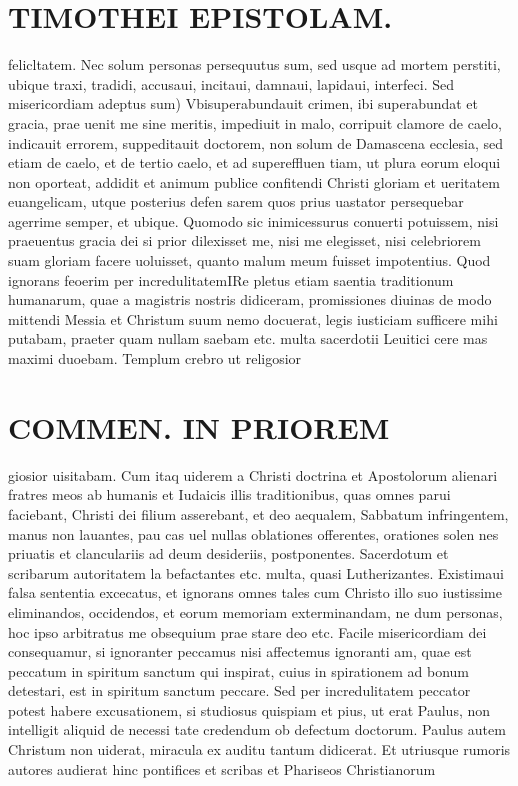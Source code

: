 \documentclass{article}
\begin{document}
\begin{pages}
\section*{TIMOTHEI EPISTOLAM. }
\marginpar{[ p.27 ]}\pstart felicltatem. Nec solum personas persequutus sum, sed usque ad mortem perstiti, ubique traxi, tradidi, accusaui, incitaui, damnaui, lapidaui, interfeci.  \pend\pstart Sed misericordiam adeptus sum) Vbisuperabundauit crimen, ibi superabundat et gracia, prae uenit me sine meritis, impediuit in malo, corripuit clamore de caelo, indicauit errorem, suppeditauit doctorem, non solum de Damascena ecclesia, sed etiam de caelo, et de tertio caelo, et ad supereffluen tiam, ut plura eorum eloqui non oporteat, addidit et animum publice confitendi Christi gloriam et ueritatem euangelicam, utque posterius defen sarem quos prius uastator persequebar agerrime semper, et ubique. Quomodo sic inimicessurus conuerti potuissem, nisi praeuentus gracia dei si prior dilexisset me, nisi me elegisset, nisi celebriorem suam gloriam facere uoluisset, quanto malum meum fuisset impotentius.  \pend\pstart Quod ignorans feoerim per incredulitatemIRe pletus etiam saentia traditionum humanarum, quae a magistris nostris didiceram, promissiones diuinas de modo mittendi Messia et Christum suum nemo docuerat, legis iusticiam sufficere mihi putabam, praeter quam nullam saebam etc. multa sacerdotii Leuitici cere mas maximi duoebam. Templum crebro ut religosior  \pend
\section*{COMMEN. IN PRIOREM }
\marginpar{[ p.28 ]}\pstart giosior uisitabam. Cum itaq uiderem a Christi doctrina et Apostolorum alienari fratres meos ab humanis et Iudaicis illis traditionibus, quas omnes parui faciebant, Christi dei filium asserebant, et deo aequalem, Sabbatum infringentem, manus non lauantes, pau cas uel nullas oblationes offerentes, orationes solen nes priuatis et clanculariis ad deum desideriis, postponentes. Sacerdotum et scribarum autoritatem la befactantes etc. multa, quasi Lutherizantes. Existimaui falsa sententia excecatus, et ignorans omnes tales cum Christo illo suo iustissime eliminandos, occidendos, et eorum memoriam exterminandam, ne dum personas, hoc ipso arbitratus me obsequium prae stare deo etc.  \pend\pstart Facile misericordiam dei consequamur, si ignoranter peccamus nisi affectemus ignoranti am, quae est peccatum in spiritum sanctum qui inspirat, cuius in spirationem ad bonum detestari, est in spiritum sanctum peccare. Sed per incredulitatem peccator potest habere excusationem, si studiosus quispiam et pius, ut erat Paulus, non intelligit aliquid de necessi tate credendum ob defectum doctorum. Paulus autem Christum non uiderat, miracula ex auditu tantum didicerat. Et utriusque rumoris autores audierat hinc pontifices et scribas et Phariseos Christianorum  \pend

\end{pages}
\end{document}
